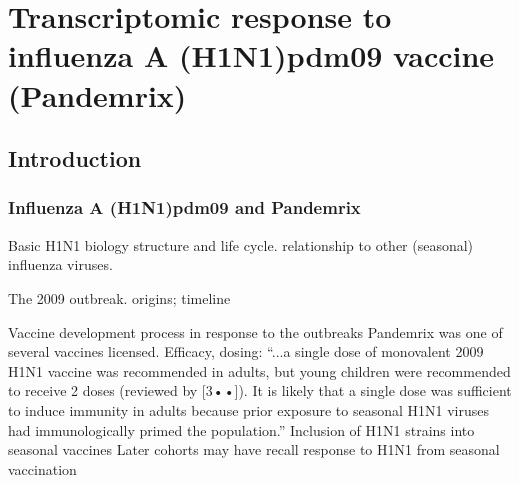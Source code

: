 %
%

\chapter{Transcriptomic response to influenza A (H1N1)pdm09 vaccine (Pandemrix)}


\section{Introduction}

\subsection{Influenza A (H1N1)pdm09 and Pandemrix}

\begin{outline}

\1 Basic H1N1 biology
    \2 structure and life cycle.
    \2 relationship to other (seasonal) influenza viruses.

\1 The 2009 outbreak.
    \2 origins; timeline

\1 Vaccine development process in response to the outbreaks
    \2 Pandemrix was one of several vaccines licensed.
    \2 Efficacy, dosing: \enquote{...a single dose of monovalent 2009 H1N1 vaccine was recommended in adults, but young children were recommended to receive 2 doses (reviewed by [3••]). It is likely that a single dose was sufficient to induce immunity in adults because prior exposure to seasonal H1N1 viruses had immunologically primed the population.}
    \2 Inclusion of H1N1 strains into seasonal vaccines
        \3 Later cohorts may have recall response to H1N1 from seasonal vaccination

\end{outline}

